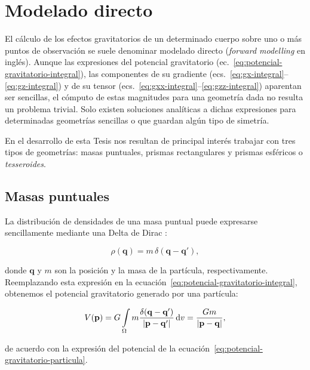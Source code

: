 \section{Modelado directo}

El cálculo de los efectos gravitatorios de un determinado cuerpo sobre uno
o más puntos de observación se suele denominar modelado directo (\emph{forward
modelling} en inglés).
Aunque las expresiones del potencial gravitatorio
(ec.~\ref{eq:potencial-gravitatorio-integral}),
las componentes de su gradiente
(ecs.~\ref{eq:gx-integral}--\ref{eq:gz-integral})
y de su tensor (ecs.~\ref{eq:gxx-integral}--\ref{eq:gzz-integral})
aparentan ser sencillas, el cómputo de estas magnitudes para una geometría dada
no resulta un problema trivial.
Solo existen soluciones analíticas a dichas expresiones para determinadas
geometrías sencillas o que guardan algún tipo de simetría.

En el desarrollo de esta Tesis nos resultan de principal interés trabajar con
tres tipos de geometrías: masas puntuales, prismas rectangulares y prismas
esféricos o \emph{tesseroides}.

\subsection{Masas puntuales}

La distribución de densidades de una masa puntual puede expresarse
sencillamente mediante una Delta de Dirac \citep{vladimirov1979}:

\begin{equation}
    \rho(\mathbf{q}) = m \, \delta(\mathbf{q} - \mathbf{q'}),
\end{equation}

\noindent donde $\mathbf{q}$ y $m$ son la posición y la masa de la partícula,
respectivamente.
Reemplazando esta expresión en la
ecuación~\ref{eq:potencial-gravitatorio-integral}, obtenemos el potencial
gravitatorio generado por una partícula:

\begin{equation}
    V(\mathbf{p}) =
        G \int\limits_\Omega
        m \frac{\delta(\mathbf{q} - \mathbf{q'})}{|\mathbf{p} - \mathbf{q'}|}
        \mathop{}\!\textnormal{d} v =
        \frac{G m}{|\mathbf{p} - \mathbf{q}|},
    \label{eq:potencial-masa-puntual}
\end{equation}

\noindent de acuerdo con la expresión del potencial de la
ecuación~\ref{eq:potencial-gravitatorio-particula}.

